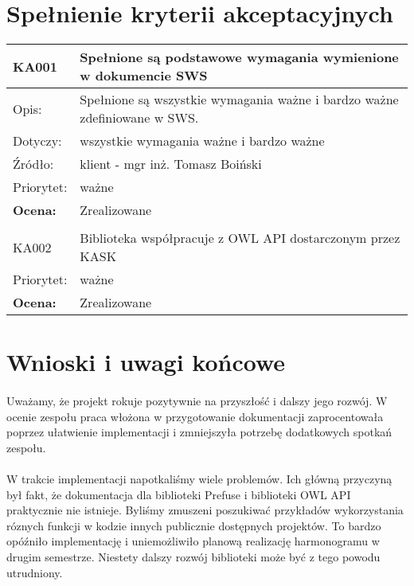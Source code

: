 \documentclass[a4paper,10pt]{article}
\begin{document}
\section{Spełnienie kryterii akceptacyjnych}


\begin{center}

\begin{tabular}{|m{3cm}|m{9cm}|} \hline

KA001 & Spełnione są podstawowe wymagania wymienione w dokumencie SWS \\ \hline
Opis: & Spełnione są wszystkie wymagania ważne i bardzo ważne zdefiniowane w SWS. \\ \hline
Dotyczy: & wszystkie wymagania ważne i bardzo ważne \\ \hline
Źródło: & klient - mgr inż. Tomasz Boiński \\ \hline
Priorytet: & ważne  \\ \hline %
\textbf{Ocena:} & Zrealizowane \\ \hline
\multicolumn{2}{c}{} \\
 \hline

KA002 & Biblioteka współpracuje z OWL API dostarczonym przez KASK \\ \hline
Priorytet: & ważne  \\ \hline %
\textbf{Ocena:} & Zrealizowane \\ \hline
\end{tabular}

\end{center}


\section{Wnioski i uwagi końcowe}

\paragraph{} Uważamy, że projekt rokuje pozytywnie na przyszłość i dalszy jego rozwój. W ocenie zespołu praca włożona w przygotowanie dokumentacji zaprocentowała poprzez ułatwienie implementacji i zmniejszyła potrzebę dodatkowych spotkań zespołu. 
\paragraph{} W trakcie implementacji napotkaliśmy wiele problemów. Ich główną przyczyną był fakt, że dokumentacja dla biblioteki Prefuse i biblioteki OWL API praktycznie nie istnieje. Byliśmy zmuszeni poszukiwać przykładów wykorzystania róznych funkcji w kodzie innych publicznie dostępnych projektów. To bardzo opóźniło implementację i uniemożliwiło planową realizację harmonogramu w drugim semestrze. Niestety dalszy rozwój biblioteki może być z tego powodu utrudniony. 
\end{document}

